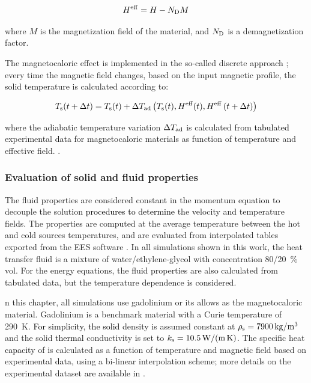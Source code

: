 \documentclass[referee]{svjour3}
\begin{document}
\begin{equation}
  \label{eq:6}
  H^{\mathrm{eff}} = H - N_{\mathrm{D}} M
\end{equation}


\noindent where $M$ is the magnetization field of the material, and $N_{\mathrm{D}}$ is a demagnetization factor.

The magnetocaloric effect is implemented in the so-called discrete approach \cite{bib:nielsen11_review}; every time the magnetic field changes, based on the input magnetic profile, the solid temperature is calculated according to:

\begin{equation}
  \label{eq:89}
  T_{\mathrm{s}}(t + \Delta{}t) = T_{\mathrm{s}}(t) + \Delta{}T_{\mathrm{ad}} \left(T_{\mathrm{s}}(t),H^{\mathrm{eff}}(t),H^{\mathrm{eff}}\left(t + \Delta{}t\right)\right)
\end{equation}



\noindent where the adiabatic temperature variation $\Delta{}T_{\mathrm{ad}}$ is calculated from \textcolor{black}{tabulated} experimental \textcolor{black}{data} for magnetocaloric materials as function of temperature and effective field. \cite{bib:trevizoli16_perfor_model}.

\subsubsection{Evaluation of solid and fluid properties}
\label{sec:eval-solid-fluid}

The fluid properties are considered constant in the momentum equation to decouple the solution \textcolor{black}{procedures to determine} the velocity and temperature fields. The properties are computed at the average temperature between the hot and cold sources temperatures, and are evaluated from interpolated tables exported from the EES software \cite{bib:klein13-ees}. In all simulations shown in this work, the heat transfer fluid is a mixture of water/ethylene-glycol with concentration \num{80}/\SI{20}{\percent} vol. For the energy equations, the fluid properties are also calculated from tabulated data, but the temperature dependence is considered.

n this chapter, all simulations use gadolinium or its allows as the magnetocaloric material. Gadolinium is a benchmark material with a Curie temperature of \SI{290}{\kelvin}. \textcolor{black}{For simplicity, the solid} density is assumed constant at $\rho\ped{s} = \SI{7900}{\kg\per\cubic\meter}$ and the solid \textcolor{black}{thermal} conductivity is set to $k_{\mathrm{s}} = \SI{10.5}{\watt\per\meter\per\kelvin}$. The specific heat \textcolor{black}{capacity} of  is calculated as a function of temperature and magnetic field based on experimental \textcolor{black}{data}, using a bi-linear interpolation scheme; more details on the experimental dataset \textcolor{black}{are available} in \cite{bib:trevizoli16_perfor_model}. 
\end{document}

